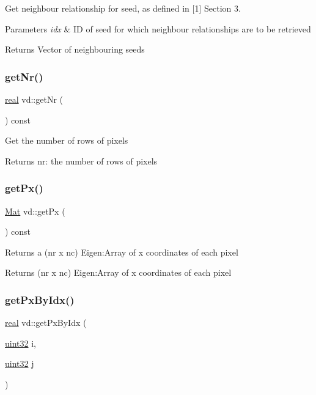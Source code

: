 Get neighbour relationship for seed, as defined in \mbox{[}1\mbox{]} Section 3. 
\begin{DoxyParams}{Parameters}
{\em idx} & ID of seed for which neighbour relationships are to be retrieved \\
\hline
\end{DoxyParams}
\begin{DoxyReturn}{Returns}
Vector of neighbouring seeds 
\end{DoxyReturn}
\mbox{\label{classvd_a1a1634d6906eb0af4d877c2af3292ca7}} 
\subsubsection{\texorpdfstring{get\+Nr()}{getNr()}}
{\footnotesize\ttfamily \mbox{\hyperlink{typedefs_8cpp_a58a0c7cf2501f4492da833421be92547}{real}} vd\+::get\+Nr (\begin{DoxyParamCaption}{ }\end{DoxyParamCaption}) const}

Get the number of rows of pixels \begin{DoxyReturn}{Returns}
nr\+: the number of rows of pixels 
\end{DoxyReturn}
\mbox{\label{classvd_aeba6d318016c8f8b9537ce4c0314f8cd}} 
\subsubsection{\texorpdfstring{get\+Px()}{getPx()}}
{\footnotesize\ttfamily \mbox{\hyperlink{typedefs_8cpp_a9fa28c1f74e909474857584f5c7b0088}{Mat}} vd\+::get\+Px (\begin{DoxyParamCaption}{ }\end{DoxyParamCaption}) const}

Returns a (nr x nc) Eigen\+:Array of x coordinates of each pixel \begin{DoxyReturn}{Returns}
(nr x nc) Eigen\+:Array of x coordinates of each pixel 
\end{DoxyReturn}
\mbox{\label{classvd_aa80f528bca24356805f2a31234e67ac1}} 
\subsubsection{\texorpdfstring{get\+Px\+By\+Idx()}{getPxByIdx()}}
{\footnotesize\ttfamily \mbox{\hyperlink{typedefs_8cpp_a58a0c7cf2501f4492da833421be92547}{real}} vd\+::get\+Px\+By\+Idx (\begin{DoxyParamCaption}\item[{\mbox{\hyperlink{typedefs_8cpp_a8ad23e2333787a214e20a58a284a5a60}{uint32}}}]{i,  }\item[{\mbox{\hyperlink{typedefs_8cpp_a8ad23e2333787a214e20a58a284a5a60}{uint32}}}]{j }\end{DoxyParamCaption})}

